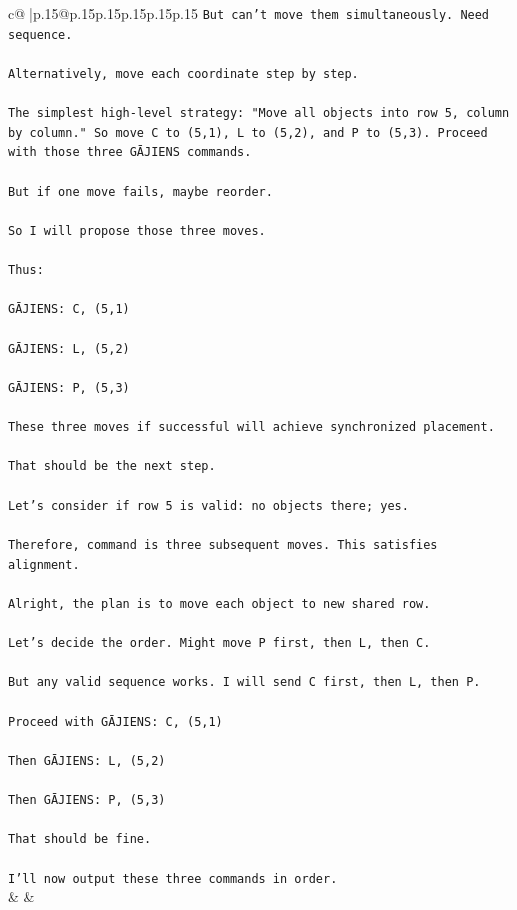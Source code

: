 \documentclass{article}
\begin{document}
{\begin{supertabular}{c@{$\;$}|p{.15\linewidth}@{}p{.15\linewidth}p{.15\linewidth}p{.15\linewidth}p{.15\linewidth}p{.15\linewidth}}
{{{\texttt{But can't move them simultaneously. Need sequence.} \\
\\ 
\texttt{Alternatively, move each coordinate step by step.} \\
\\ 
\texttt{The simplest high{-}level strategy: "Move all objects into row 5, column by column." So move C to (5,1), L to (5,2), and P to (5,3). Proceed with those three GĀJIENS commands.} \\
\\ 
\texttt{But if one move fails, maybe reorder.} \\
\\ 
\texttt{So I will propose those three moves.} \\
\\ 
\texttt{Thus:} \\
\\ 
\texttt{GĀJIENS: C, (5,1)} \\
\\ 
\texttt{GĀJIENS: L, (5,2)} \\
\\ 
\texttt{GĀJIENS: P, (5,3)} \\
\\ 
\texttt{These three moves if successful will achieve synchronized placement.} \\
\\ 
\texttt{That should be the next step.} \\
\\ 
\texttt{Let's consider if row 5 is valid: no objects there; yes.} \\
\\ 
\texttt{Therefore, command is three subsequent moves. This satisfies alignment.} \\
\\ 
\texttt{Alright, the plan is to move each object to new shared row.} \\
\\ 
\texttt{Let's decide the order. Might move P first, then L, then C.} \\
\\ 
\texttt{But any valid sequence works. I will send C first, then L, then P.} \\
\\ 
\texttt{Proceed with GĀJIENS: C, (5,1)} \\
\\ 
\texttt{Then GĀJIENS: L, (5,2)} \\
\\ 
\texttt{Then GĀJIENS: P, (5,3)} \\
\\ 
\texttt{That should be fine.} \\
\\ 
\texttt{I'll now output these three commands in order.} \\
            }
        }
    }
    & & \\ \\


\end{supertabular}}
\end{document}
